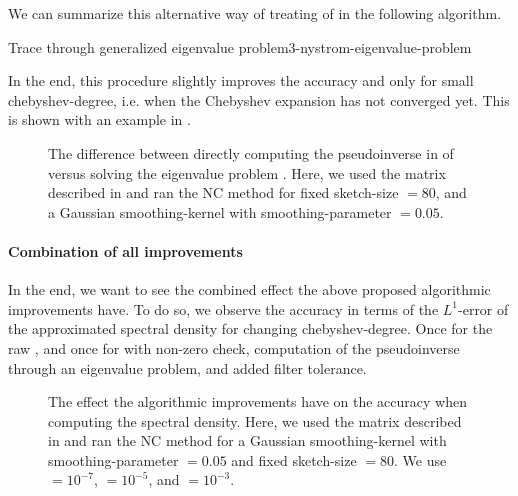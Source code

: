 We can summarize this alternative way of treating
 of 
in the following algorithm.
\begin{algo}{Trace through generalized eigenvalue problem}{3-nystrom-eigenvalue-problem}
    
\end{algo}

In the end, this procedure slightly improves the accuracy
and only for small \gls{chebyshev-degree}, i.e. when the Chebyshev expansion has
not converged yet. This is shown with an example in .\\

\begin{figure}[ht]
    \centering
    
    \caption{The difference between directly computing the pseudoinverse
        in  of 
        versus solving the eigenvalue problem .
        Here, we used the matrix described in 
        and ran the \gls{NC} method for fixed \gls{sketch-size} $=80$, and a
        Gaussian \gls{smoothing-kernel} with \gls{smoothing-parameter} $=0.05$.}
    \label{fig:3-nystrom-eigenvalue-problem}
\end{figure}

\paragraph{Combination of all improvements}

In the end, we want to see the combined effect the above proposed algorithmic
improvements have. To do so, we observe the accuracy in terms of the $L^1$-error
of the approximated spectral density for changing \gls{chebyshev-degree}. Once
for the raw , and once for 
with non-zero check, computation of the pseudoinverse through
an eigenvalue problem, and added filter tolerance.

\begin{figure}[ht]
    \centering
    
    \caption{The effect the algorithmic improvements have on the accuracy when
        computing the spectral density.
        Here, we used the matrix described in 
        and ran the \gls{NC} method for a Gaussian \gls{smoothing-kernel} with \gls{smoothing-parameter} $=0.05$
        and fixed \gls{sketch-size} $=80$. We use
         $=10^{-7}$,
         $=10^{-5}$, and
         $=10^{-3}$.}
    \label{fig:3-nystrom-improved-algorithm}
\end{figure}

